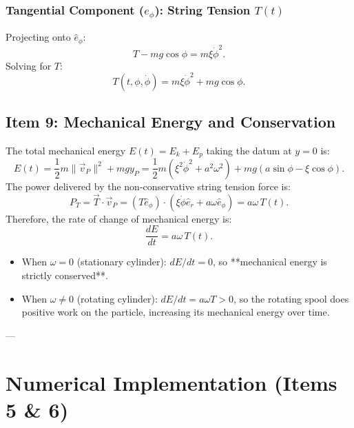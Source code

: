 \documentclass[11pt,a4paper]{article}
\begin{document}
\subsubsection{Tangential Component ($\hat{e}_\phi$): String Tension $T(t)$}
Projecting onto $\hat{e}_\phi$:
\begin{equation}
    T - mg\cos\phi = m\xi\dot{\phi}^2.
\end{equation}
Solving for $T$:
\begin{equation}
    \label{eq:tension_final}
    T(t, \phi, \dot{\phi}) = m\xi\dot{\phi}^2 + mg\cos\phi.
\end{equation}

\subsection{Item 9: Mechanical Energy and Conservation}
The total mechanical energy $E(t) = E_k + E_p$ taking the datum at $y = 0$ is:
\begin{equation}
    \label{eq:energy_final}
    E(t) = \frac{1}{2}m\|\vec{v}_P\|^2 + mgy_P = \frac{1}{2}m\left(\xi^2\dot{\phi}^2 + a^2\omega^2\right) + mg\left(a\sin\phi - \xi\cos\phi\right).
\end{equation}
The power delivered by the non-conservative string tension force is:
\begin{equation}
    P_T = \vec{T} \cdot \vec{v}_P = \left(T\hat{e}_\phi\right) \cdot \left(\xi\dot{\phi}\hat{e}_r + a\omega\hat{e}_\phi\right) = a\omega\,T(t).
\end{equation}
Therefore, the rate of change of mechanical energy is:
\begin{equation}
    \label{eq:dE_dt}
    \frac{dE}{dt} = a\omega\,T(t).
\end{equation}
\begin{itemize}
    \item When $\omega = 0$ (stationary cylinder): $dE/dt = 0$, so **mechanical energy is strictly conserved**.
    \item When $\omega \neq 0$ (rotating cylinder): $dE/dt = a\omega T > 0$, so the rotating spool does positive work on the particle, increasing its mechanical energy over time.
\end{itemize}

---

\section{Numerical Implementation (Items 5 \& 6)}
\label{sec:numerical}
\end{document}
